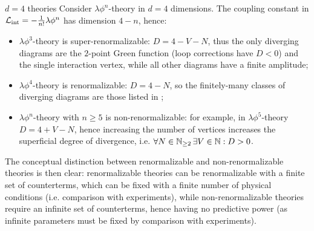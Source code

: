 \begin{example}{$ d = 4 $ theories}{}
  Consider $ \lambda \phi^n $-theory in $ d = 4 $ dimensions. The coupling constant in $ \mathcal{L}_\text{int} = - \frac{1}{n!} \lambda \phi^n $ has dimension $ 4 - n $, hence:
  \begin{itemize}
    \item $ \lambda \phi^3 $-theory is super-renormalizable: $ D = 4 - V - N $, thus the only diverging diagrams are the $ 2 $-point Green function (loop corrections have $ D < 0 $) and the single interaction vertex, while all other diagrams have a finite amplitude;
    \item $ \lambda \phi^4 $-theory is renormalizable: $ D = 4 - N $, so the finitely-many classes of diverging diagrams are those listed in ;
    \item $ \lambda \phi^n $-theory with $ n \ge 5 $ is non-renormalizable: for example, in $ \lambda \phi^5 $-theory $ D = 4 + V - N $, hence increasing the number of vertices increases the superficial degree of divergence, i.e. $ \forall N \in \mathbb{N}_{\ge 2} \, \exists V \in \mathbb{N} : D > 0 $.
  \end{itemize}
\end{example}

The conceptual distinction between renormalizable and non-renormalizable theories is then clear: renormalizable theories can be renormalizable with a finite set of counterterms, which can be fixed with a finite number of physical conditions (i.e. comparison with experiments), while non-renormalizable theories require an infinite set of counterterms, hence having no predictive power (as infinite parameters must be fixed by comparison with experiments).

